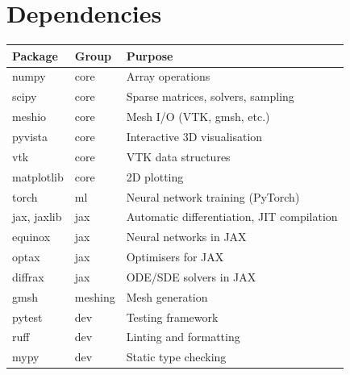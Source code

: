 \documentclass[11pt,a4paper]{report}
\begin{document}
\appendix

\chapter{Dependencies}

\begin{longtable}{lll}
\toprule
\textbf{Package} & \textbf{Group} & \textbf{Purpose} \\
\midrule
numpy & core & Array operations \\
scipy & core & Sparse matrices, solvers, sampling \\
meshio & core & Mesh I/O (VTK, gmsh, etc.) \\
pyvista & core & Interactive 3D visualisation \\
vtk & core & VTK data structures \\
matplotlib & core & 2D plotting \\
\midrule
torch & ml & Neural network training (PyTorch) \\
\midrule
jax, jaxlib & jax & Automatic differentiation, JIT compilation \\
equinox & jax & Neural networks in JAX \\
optax & jax & Optimisers for JAX \\
diffrax & jax & ODE/SDE solvers in JAX \\
\midrule
gmsh & meshing & Mesh generation \\
\midrule
pytest & dev & Testing framework \\
ruff & dev & Linting and formatting \\
mypy & dev & Static type checking \\
\bottomrule
\end{longtable}
\end{document}
